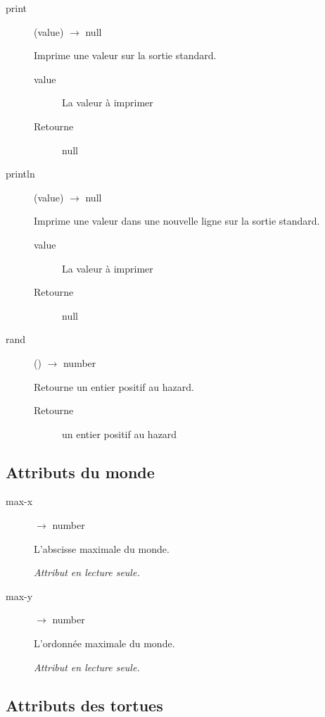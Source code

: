 \begin{description}
	\item[print] (value) $\rightarrow$ null

	Imprime une valeur sur la sortie standard.

	\begin{description}
		\item[value] La valeur à imprimer
		\item[Retourne] null
	\end{description}

	\item[println] (value) $\rightarrow$ null

	Imprime une valeur dans une nouvelle ligne sur la sortie standard.

	\begin{description}
		\item[value] La valeur à imprimer
		\item[Retourne] null
	\end{description}

	\item[rand] () $\rightarrow$ number

	Retourne un entier positif au hazard.

	\begin{description}
		\item[Retourne] un entier positif au hazard
	\end{description}
\end{description}

\subsection{Attributs du monde}

\begin{description}
	\item[max-x] $\rightarrow$ number

	L'abscisse maximale du monde.

	\emph{Attribut en lecture seule.}

	\item[max-y] $\rightarrow$ number

	L'ordonnée maximale du monde.

	\emph{Attribut en lecture seule.}
\end{description}

\subsection{Attributs des tortues}

